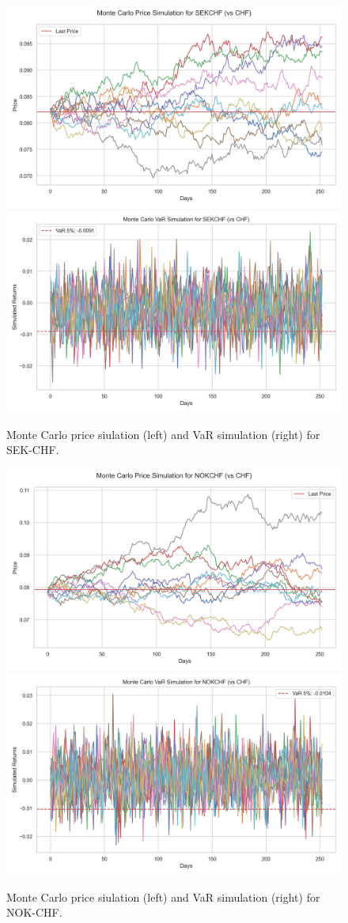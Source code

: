 \documentclass{article}
\begin{document}
\begin{figure}[H]
    \centering  \includegraphics[width=0.48\linewidth]{reports/figures/monte_carlo_price_simulation_SEKCHF_vs_CHF.png} \label{fig:monte_carlo_price_simulation_SEKCHF_vs_CHF}
    \includegraphics[width=0.48\linewidth]{reports/figures/monte_carlo_var_simulation_SEKCHF_vs_CHF.png} \label{fig:monte_carlo_var_simulation_SEKCHF_vs_CHF}
    \caption{\footnotesize Monte Carlo price siulation (left) and VaR simulation (right) for SEK-CHF.}
\end{figure}

\begin{figure}[H]
    \centering  \includegraphics[width=0.48\linewidth]{reports/figures/monte_carlo_price_simulation_NOKCHF_vs_CHF.png} \label{fig:monte_carlo_price_simulation_NOKCHF_vs_CHF}
    \includegraphics[width=0.48\linewidth]{reports/figures/monte_carlo_var_simulation_NOKCHF_vs_CHF.png} \label{fig:monte_carlo_var_simulation_NOKCHF_vs_CHF}
    \caption{\footnotesize Monte Carlo price siulation (left) and VaR simulation (right) for NOK-CHF.}
\end{figure}
\end{document}
